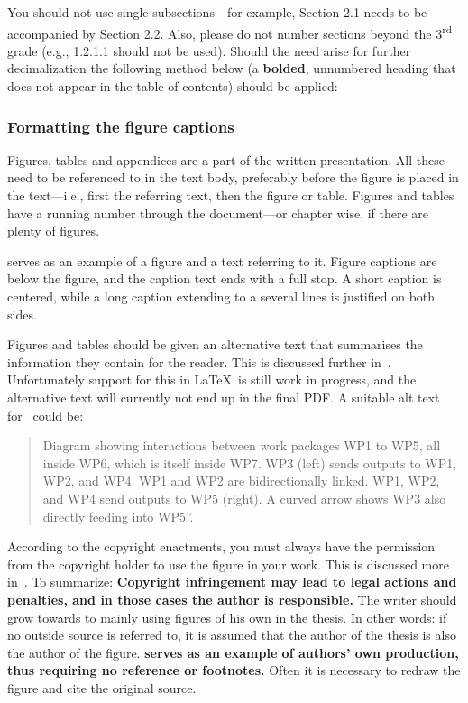You should not use single subsections---for example, Section 2.1
needs to be accompanied by Section 2.2. Also, please do not number
sections beyond the 3\textsuperscript{rd}  grade (e.g., 1.2.1.1
should not be used). Should the need arise for further decimalization
the following method below (a \textbf{bolded}, unnumbered heading
that does not appear in the table of contents) should be applied:

\subsubsection{Formatting the figure captions} Figures, tables and
appendices are a part of the written presentation. All these need to
be referenced to in the text body, preferably before the figure is
placed in the text---i.e., first the referring text, then the figure
or table. Figures and tables have a running number through the
document---or chapter wise, if there are plenty of figures.

 serves as an example of a figure and a
text referring to it. Figure captions are below the figure, and the
caption text ends with a full stop. A short caption is centered,
while a long caption extending to a several lines is justified on both sides.

Figures and tables should be given an alternative text that summarises
the information they contain for the reader. This is discussed further
in~. Unfortunately support for this in
\LaTeX\ is still work in progress, and the alternative text will
currently not end up in the final PDF. A suitable alt text
for~ could be:
\begin{quote}
  Diagram showing interactions between work packages WP1 to WP5, all
  inside WP6, which is itself inside WP7. WP3 (left) sends outputs to
  WP1, WP2, and WP4. WP1 and WP2 are bidirectionally linked. WP1, WP2,
  and WP4 send outputs to WP5 (right). A curved arrow shows WP3 also
  directly feeding into WP5''.
\end{quote}

According to the copyright enactments, you must always have the
permission from the copyright holder to use the figure in your work.
This is discussed more in~. To summarize:
\textbf{Copyright infringement may lead to legal actions and
penalties, and in those cases the author is responsible.} The writer
should grow towards to mainly using figures of his own in the thesis.
In other words: if no outside source is referred to, it is assumed
that the author of the thesis is also the author of the figure.
\textbf{  serves as an example of authors'
own production, thus requiring no reference or footnotes.}  Often it
is necessary to redraw the figure and cite the original source.

